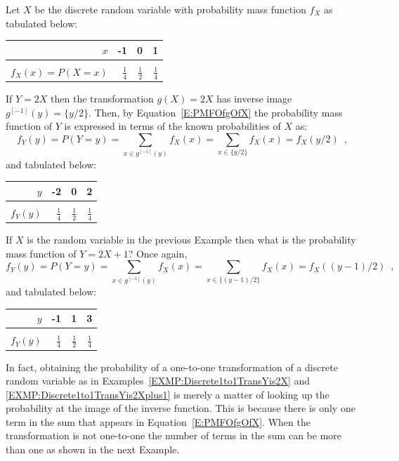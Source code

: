 \begin{example}\label{EXMP:Discrete1to1TransYis2X}
Let $X$ be the discrete random variable with probability mass function $f_X$ as tabulated below:\\
\begin{center}
\begin{tabular}{r|rrr}
$x$ & -1 & 0 & 1\\ \hline
 &  &  & \\ 
$f_X(x)=P(X=x)$ & $\frac{1}{4}$ & $\frac{1}{2}$ & $\frac{1}{4}$
\end{tabular}
\end{center}
If $Y=2X$ then the transformation $g(X)=2X$ has inverse image $g^{[-1]}(y)=\{y/2\}$.  
Then, by Equation~\eqref{E:PMFOfgOfX} the probability mass function of $Y$ is expressed in terms of the known probabilities of $X$ as:\\ 
$$f_Y(y)=P(Y=y)= \sum_{x \in g^{[-1]}(y)} f_X(x)  = \sum_{x \in \{y/2\}} f_X(x) = f_X(y/2) \enspace ,$$
and tabulated below:\\
\begin{center}
\begin{tabular}{r|rrr}
$y$ & -2 & 0 & 2\\ \hline
 &  &  & \\ 
$f_Y(y)$ & $\frac{1}{4}$ & $\frac{1}{2}$ & $\frac{1}{4}$
\end{tabular}
\end{center}
\end{example}

\begin{example}\label{EXMP:Discrete1to1TransYis2Xplus1}
If $X$ is the random variable in the previous Example then what is the probability mass function of $Y=2X+1$?
Once again,
$$f_Y(y)=P(Y=y)= \sum_{x \in g^{[-1]}(y)} f_X(x)  = \sum_{x \in \{(y-1)/2\}} f_X(x) = f_X((y-1)/2) \enspace ,$$
and tabulated below:\\
\begin{center}
\begin{tabular}{r|rrr}
$y$ & -1 & 1 & 3\\ \hline
 &  &  & \\ 
$f_Y(y)$ & $\frac{1}{4}$ & $\frac{1}{2}$ & $\frac{1}{4}$
\end{tabular}
\end{center}
\end{example}

In fact, obtaining the probability of a one-to-one transformation of a discrete random variable as in Examples~\ref{EXMP:Discrete1to1TransYis2X} and \ref{EXMP:Discrete1to1TransYis2Xplus1} is merely a matter of looking up the probability at the image of the inverse function.  This is because there is only one term in the sum that appears in Equation~\eqref{E:PMFOfgOfX}.  When the transformation is not one-to-one the number of terms in the sum can be more than one as shown in the next Example.

